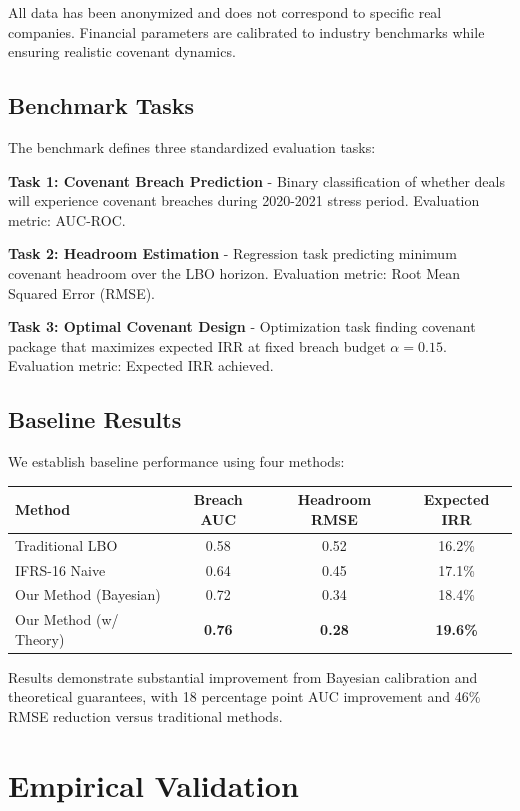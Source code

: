 \documentclass[11pt,a4paper]{article}
\begin{document}
All data has been anonymized and does not correspond to specific real companies. Financial parameters are calibrated to industry benchmarks while ensuring realistic covenant dynamics.

\subsection{Benchmark Tasks}

The benchmark defines three standardized evaluation tasks:

\textbf{Task 1: Covenant Breach Prediction} - Binary classification of whether deals will experience covenant breaches during 2020-2021 stress period. Evaluation metric: AUC-ROC.

\textbf{Task 2: Headroom Estimation} - Regression task predicting minimum covenant headroom over the LBO horizon. Evaluation metric: Root Mean Squared Error (RMSE).

\textbf{Task 3: Optimal Covenant Design} - Optimization task finding covenant package that maximizes expected IRR at fixed breach budget $\alpha = 0.15$. Evaluation metric: Expected IRR achieved.

\subsection{Baseline Results}

We establish baseline performance using four methods:

\begin{center}
\begin{tabular}{lccc}
\toprule
Method & Breach AUC & Headroom RMSE & Expected IRR \\
\midrule
Traditional LBO & 0.58 & 0.52 & 16.2\% \\
IFRS-16 Naive & 0.64 & 0.45 & 17.1\% \\
Our Method (Bayesian) & 0.72 & 0.34 & 18.4\% \\
Our Method (w/ Theory) & \textbf{0.76} & \textbf{0.28} & \textbf{19.6\%} \\
\bottomrule
\end{tabular}
\end{center}

Results demonstrate substantial improvement from Bayesian calibration and theoretical guarantees, with 18 percentage point AUC improvement and 46\% RMSE reduction versus traditional methods.

\section{Empirical Validation}
\end{document}
